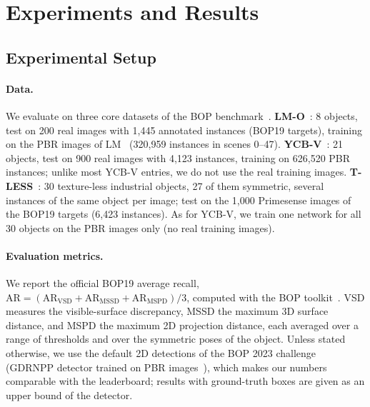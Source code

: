 \section{Experiments and Results}
\label{sec:exp}

\subsection{Experimental Setup}
\label{sec:exp:setup}

\paragraph{Data.}
We evaluate on three core datasets of the BOP benchmark~\cite{hodan2020bop}.
\textbf{LM-O}~\cite{brachmann2014lmo}: 8 objects, test on 200 real images with 1,445 annotated
instances (BOP19 targets), training on the PBR images of LM~\cite{hinterstoisser2012lm} (320,959 instances in scenes 0--47).
\textbf{YCB-V}~\cite{xiang2018posecnn}: 21 objects, test on 900 real images with 4,123
instances, training on 626,520 PBR instances; unlike most YCB-V entries, we do not use the real
training images. \textbf{T-LESS}~\cite{hodan2017tless}: 30 texture-less industrial objects, 27 of
them symmetric, several instances of the same object per image; test on the 1,000 Primesense images
of the BOP19 targets (6,423 instances). As for YCB-V, we train one network for all 30 objects on the PBR images only (no real training images).

\paragraph{Evaluation metrics.}
We report the official BOP19 average recall, $\mathrm{AR} = (\mathrm{AR}_{\mathrm{VSD}} +
\mathrm{AR}_{\mathrm{MSSD}} + \mathrm{AR}_{\mathrm{MSPD}})/3$, computed with the BOP
toolkit~\cite{hodan2020bop}. VSD measures the visible-surface discrepancy, MSSD the maximum 3D
surface distance, and MSPD the maximum 2D projection distance, each averaged over a range of
thresholds and over the symmetric poses of the object. Unless stated otherwise, we use the
default 2D detections of the BOP 2023 challenge (GDRNPP detector trained on PBR
images~\cite{liu2022gdrnpp}), which makes our numbers comparable with the leaderboard; results with
ground-truth boxes are given as an upper bound of the detector.

